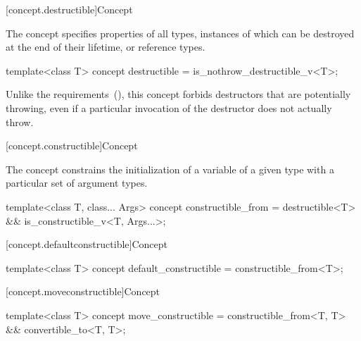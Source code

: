 [concept.destructible]{Concept }

\pnum
The  concept specifies properties of all types,
instances of which can be destroyed at the end of their lifetime, or reference
types.

%
\begin{itemdecl}
template<class T>
  concept destructible = is_nothrow_destructible_v<T>;
\end{itemdecl}

\begin{itemdescr}
\pnum
\begin{note}
Unlike the  requirements~(), this
concept forbids destructors that are potentially throwing, even if a particular
invocation of the destructor does not actually throw.
\end{note}
\end{itemdescr}

[concept.constructible]{Concept }

\pnum
The  concept constrains the initialization of a
variable of a given type with a particular set of argument types.

%
\begin{itemdecl}
template<class T, class... Args>
  concept constructible_from = destructible<T> && is_constructible_v<T, Args...>;
\end{itemdecl}

[concept.defaultconstructible]{Concept }

%
\begin{itemdecl}
template<class T>
  concept default_constructible = constructible_from<T>;
\end{itemdecl}

[concept.moveconstructible]{Concept }

%
\begin{itemdecl}
template<class T>
  concept move_constructible = constructible_from<T, T> && convertible_to<T, T>;
\end{itemdecl}

